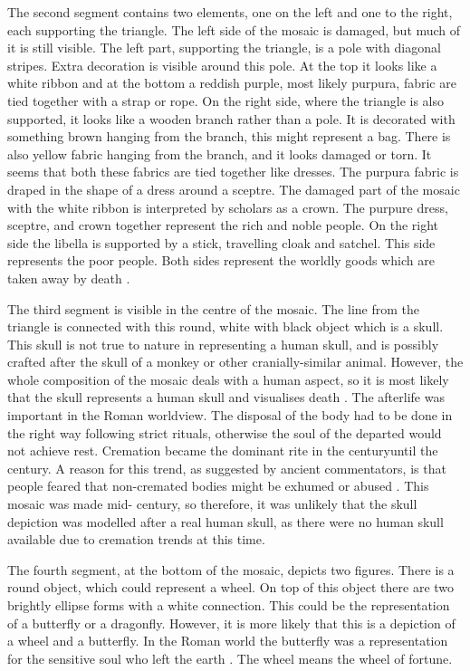 	The second segment contains two elements, one on the left and one to the right, 
each supporting the triangle. The left side of the mosaic is damaged, but much of it is still visible. 
The left part, supporting the triangle, is a pole with diagonal stripes. Extra decoration is visible around this pole. 
At the top it looks like a white ribbon and at the bottom a reddish purple, most likely purpura, 
fabric are tied together with a strap or rope. 
On the right side, where the triangle is also supported, it looks like a wooden branch rather than a pole. It is decorated with something brown hanging from the branch, this might represent a bag. 
There is also yellow fabric hanging from the branch, and it looks damaged or torn. It seems that both these fabrics are tied together like dresses.
	The purpura fabric is draped in the shape of a dress around a sceptre. The damaged part of the mosaic with the white ribbon is interpreted by scholars as a crown. The purpure dress, sceptre, and crown together represent the rich and noble people. On the right side the libella is supported by a stick, travelling cloak and satchel. 
This side represents the poor people. Both sides represent the worldly goods which are taken away by death \parencites[99--100]{Cuomo_2007}[9]{Sogliano_1874}. 

	The third segment is visible in the centre of the mosaic. The line from the triangle is connected with this round, white with black object which is a skull. This skull is not true to nature in representing a human skull, and is possibly crafted after the skull of a monkey or other cranially-similar animal. However, the whole composition of the mosaic deals with a human aspect, so it is most likely that the skull represents a human skull and visualises death \parencite [99] {Cuomo_2007}. 
The afterlife was important in the Roman worldview. The disposal of the body had to be done in the right way following strict rituals, otherwise the soul of the departed would not achieve rest. 
Cremation became the dominant rite in the  century\BC until the  century\AD. 
A reason for this trend, as suggested by ancient commentators, is that people feared that non-cremated bodies might be exhumed or abused \parencite [80--82] {Hope_2009}. 
This mosaic was made mid- century\BC, so therefore, it was unlikely that the skull depiction was modelled after a real human skull, as there were no human skull available
 due to cremation trends at this time.
	
	The fourth segment, at the bottom of the mosaic, depicts two figures. There is a round object, which could represent a wheel. On top of this object there are two brightly ellipse forms with a white connection. This could be the representation of a butterfly or a dragonfly. 
However, it is more likely that this is a depiction of a wheel and a butterfly. In the Roman world the butterfly was a representation for the sensitive soul who left the earth \parencite[9]{Sogliano_1874}. The wheel means the wheel of fortune\parencite[99]{Cuomo_2007}.
	
